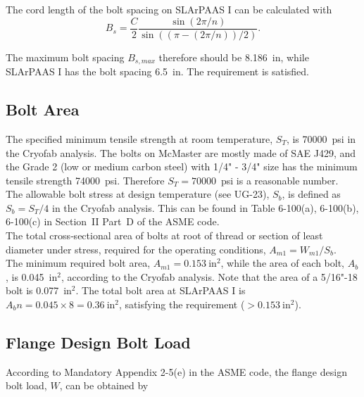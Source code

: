 The cord length of the bolt spacing on SLArPAAS I can be calculated with
\begin{equation}
    B_s = \frac{C}{2}\frac{\sin(2\pi/n)}{\sin((\pi-(2\pi/n))/2)}.
\end{equation}

The maximum bolt spacing $B_{s,max}$ therefore should be 8.186~in,
while SLArPAAS I has the bolt spacing 6.5~in.
The requirement is satisfied.

\subsection{Bolt Area}
\label{app:bolt_area}

The specified minimum tensile strength at room temperature, $S_T$,
is 70000~psi in the Cryofab analysis.
The bolts on McMaster are mostly made of SAE J429, and the Grade 2
(low or medium carbon steel) with 1/4" - 3/4" size has the minimum 
tensile strength 74000~psi.
Therefore $S_T = 70000$~psi is a reasonable number.\\

The allowable bolt stress at design temperature (see UG-23), $S_b$,
is defined as $S_b = S_T/4$ in the Cryofab analysis.
This can be found in Table 6-100(a), 6-100(b), 6-100(c) in Section~II 
Part~D of the ASME code.\\

The total cross‐sectional area of bolts at root of thread or section 
of least diameter under stress,
required for the operating conditions, $A_{m1} = W_{m1}/S_b$.\\

The minimum required bolt area, $A_{m1} = 0.153~\text{in}^2$,
while the area of each bolt, $A_b$, is 0.045~in$^2$, according to
the Cryofab analysis.
Note that the area of a 5/16"-18 bolt is 0.077~in$^2$.
The total bolt area at SLArPAAS I is $A_bn = 0.045\times 8 = 0.36~\text{in}^2$,
satisfying the requirement ($>0.153~\text{in}^2$).

\subsection{Flange Design Bolt Load}
\label{app:flange_bolt_load}

According to Mandatory Appendix 2-5(e) in the ASME code,
the flange design bolt load, $W$, can be obtained by


